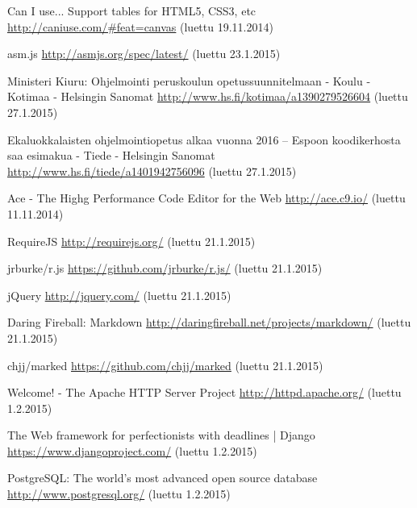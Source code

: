 \begin{thebibliography}{99}
	Can I use... Support tables for HTML5, CSS3, etc \url{http://caniuse.com/#feat=canvas} (luettu 19.11.2014)

	asm.js \url{http://asmjs.org/spec/latest/} (luettu 23.1.2015)

	Ministeri Kiuru: Ohjelmointi peruskoulun opetussuunnitelmaan - Koulu - Kotimaa - Helsingin Sanomat \url{http://www.hs.fi/kotimaa/a1390279526604} (luettu 27.1.2015)
	
	Ekaluokkalaisten ohjelmointiopetus alkaa vuonna 2016 – Espoon koodikerhosta saa esimakua - Tiede - Helsingin Sanomat \url{http://www.hs.fi/tiede/a1401942756096} (luettu 27.1.2015)

	Ace - The Highg Performance Code Editor for the Web \url{http://ace.c9.io/} (luettu 11.11.2014)

	RequireJS \url{http://requirejs.org/} (luettu 21.1.2015)
	
	jrburke/r.js \url{https://github.com/jrburke/r.js/} (luettu 21.1.2015)
	
	jQuery \url{http://jquery.com/} (luettu 21.1.2015)

	Daring Fireball: Markdown \url{http://daringfireball.net/projects/markdown/} (luettu 21.1.2015)
	
	chjj/marked \url{https://github.com/chjj/marked} (luettu 21.1.2015)
	
	Welcome! - The Apache HTTP Server Project \url{http://httpd.apache.org/} (luettu 1.2.2015)

	The Web framework for perfectionists with deadlines | Django \url{https://www.djangoproject.com/} (luettu 1.2.2015)

	PostgreSQL: The world's most advanced open source database \url{http://www.postgresql.org/} (luettu 1.2.2015)

\end{thebibliography}
